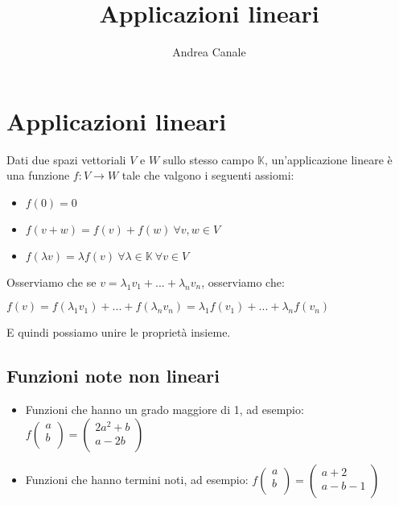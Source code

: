 \documentclass[a4paper, 10pt]{article}
\title{Applicazioni lineari}
\author{Andrea Canale}
\begin{document}
	\maketitle
	\tableofcontents
	
\section{Applicazioni lineari}

Dati due spazi vettoriali $V$ e $W$ sullo stesso campo $\mathbb{K}$, un'applicazione lineare è una funzione $f: V \rightarrow W$ tale che valgono i seguenti assiomi:

\begin{itemize}
	\item $f(0) = 0$
	\item $f(v+w) = f(v) + f(w) \ \forall v,w \in V$
	\item $f(\lambda v) = \lambda f(v) \ \forall \lambda \in \mathbb{K} \ \forall v \in V$
\end{itemize} 

Osserviamo che se $v=\lambda_1 v_1 + ... + \lambda_n v_n$, osserviamo che:

$f(v)=f(\lambda_1 v_1) + ... + f(\lambda_n v_n) = \lambda_1 f(v_1) + ... + \lambda_n f(v_n)$

E quindi possiamo unire le proprietà insieme.

\subsection{Funzioni note non lineari}

\begin{itemize}
	\item Funzioni che hanno un grado maggiore di 1, ad esempio: $f\left(\begin{matrix}a\\b\\\end{matrix}\right)=\left(\begin{matrix}2a^2+b\\a-2b\\\end{matrix}\right)
	$
	\item Funzioni che hanno termini noti, ad esempio: $f\left(\begin{matrix}a\\b\\\end{matrix}\right)=\left(\begin{matrix}a+2\\a-b-1\\\end{matrix}\right)$
\end{itemize}
\end{document}
